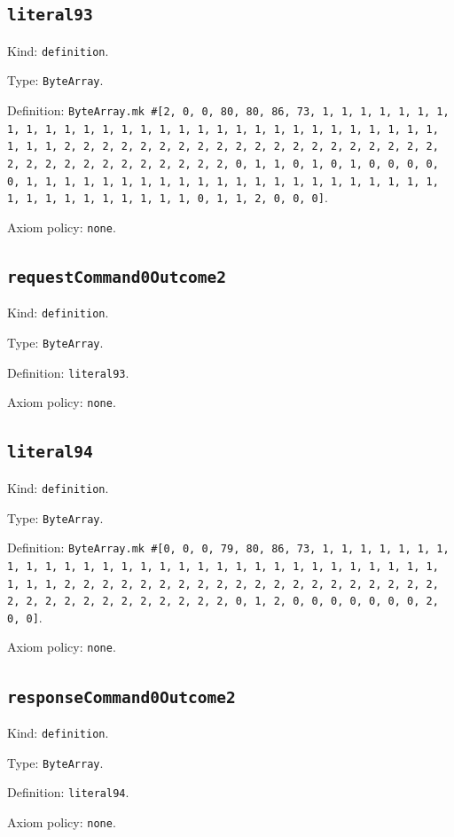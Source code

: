 \documentclass[11pt]{article}
\begin{document}
\subsection*{\texttt{literal93}}
\noindent Kind: \texttt{definition}.\par
\noindent Type: \texttt{ByteArray}.\par
\noindent Definition: \texttt{ByteArray.mk \#[2, 0, 0, 80, 80, 86, 73, 1, 1, 1, 1, 1, 1, 1, 1, 1, 1, 1, 1, 1, 1, 1, 1, 1, 1, 1, 1, 1, 1, 1, 1, 1, 1, 1, 1, 1, 1, 1, 1, 1, 2, 2, 2, 2, 2, 2, 2, 2, 2, 2, 2, 2, 2, 2, 2, 2, 2, 2, 2, 2, 2, 2, 2, 2, 2, 2, 2, 2, 2, 2, 2, 2, 0, 1, 1, 0, 1, 0, 1, 0, 0, 0, 0, 0, 1, 1, 1, 1, 1, 1, 1, 1, 1, 1, 1, 1, 1, 1, 1, 1, 1, 1, 1, 1, 1, 1, 1, 1, 1, 1, 1, 1, 1, 1, 1, 1, 0, 1, 1, 2, 0, 0, 0]}.\par
\noindent Axiom policy: \texttt{none}.\par
\subsection*{\texttt{requestCommand0Outcome2}}
\noindent Kind: \texttt{definition}.\par
\noindent Type: \texttt{ByteArray}.\par
\noindent Definition: \texttt{literal93}.\par
\noindent Axiom policy: \texttt{none}.\par
\subsection*{\texttt{literal94}}
\noindent Kind: \texttt{definition}.\par
\noindent Type: \texttt{ByteArray}.\par
\noindent Definition: \texttt{ByteArray.mk \#[0, 0, 0, 79, 80, 86, 73, 1, 1, 1, 1, 1, 1, 1, 1, 1, 1, 1, 1, 1, 1, 1, 1, 1, 1, 1, 1, 1, 1, 1, 1, 1, 1, 1, 1, 1, 1, 1, 1, 1, 2, 2, 2, 2, 2, 2, 2, 2, 2, 2, 2, 2, 2, 2, 2, 2, 2, 2, 2, 2, 2, 2, 2, 2, 2, 2, 2, 2, 2, 2, 2, 2, 0, 1, 2, 0, 0, 0, 0, 0, 0, 0, 2, 0, 0]}.\par
\noindent Axiom policy: \texttt{none}.\par
\subsection*{\texttt{responseCommand0Outcome2}}
\noindent Kind: \texttt{definition}.\par
\noindent Type: \texttt{ByteArray}.\par
\noindent Definition: \texttt{literal94}.\par
\noindent Axiom policy: \texttt{none}.\par
\end{document}
